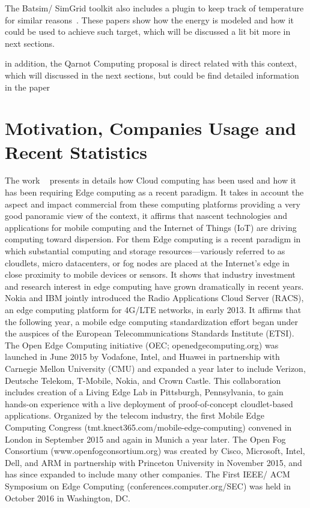 The Batsim/ SimGrid toolkit also includes a plugin to keep track of temperature for similar reasons~\cite{cooling_energy_simgrid, energy_mpi_simgrid}.
These papers show how the energy is modeled and how it could be used to achieve such target, which will be discussed a lit bit more in next sections.

in addition, the Qarnot Computing proposal is direct related with this context, which will discussed in the next sections, but could be find detailed information in the paper ~\cite{Qarnot2018}

\section{Motivation, Companies Usage and Recent Statistics}

The work ~\cite{emergency_edge} presents in details how Cloud computing has been used and how it has been requiring Edge computing as a recent paradigm. It takes in account the aspect and impact commercial from these computing platforms providing a very good panoramic view of the context, it affirms that nascent technologies and applications for mobile computing and the Internet of Things (IoT) are driving computing toward dispersion. For them Edge computing is a recent paradigm in which substantial computing and storage resources—variously referred to as cloudlets, micro datacenters, or fog nodes are placed at the Internet’s edge in close proximity to mobile devices or sensors.
It shows that industry investment and research interest in edge computing have grown dramatically in recent years. Nokia and IBM jointly introduced the Radio Applications Cloud Server (RACS), an edge computing platform for 4G/LTE networks, in early 2013. It affirms that the following year, a mobile edge computing standardization effort began under the auspices of the European Telecommunications Standards Institute (ETSI). The Open Edge Computing initiative (OEC; openedgecomputing.org) was launched in June 2015 by Vodafone, Intel, and Huawei in partnership with Carnegie Mellon University (CMU) and expanded a year later to include Verizon, Deutsche Telekom, T-Mobile, Nokia, and Crown Castle. This collaboration includes creation of a Living Edge Lab in Pittsburgh, Pennsylvania, to gain hands-on experience with a live deployment of proof-of-concept cloudlet-based applications. Organized by the telecom industry, the first Mobile Edge Computing Congress (tmt.knect365.com/mobile-edge-computing) convened in London in September 2015 and again in Munich a year later. The Open Fog Consortium (www.openfogconsortium.org) was created by Cisco, Microsoft, Intel, Dell, and ARM in partnership with Princeton University in November 2015, and has since expanded to include many other companies. The First IEEE/ ACM Symposium on Edge Computing (conferences.computer.org/SEC) was held in October 2016 in Washington, DC.

